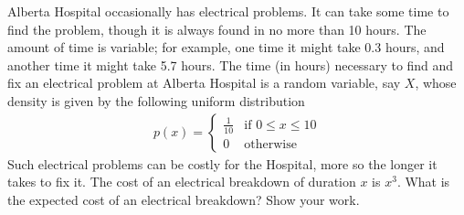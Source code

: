 Alberta Hospital occasionally has electrical problems. It can take some time to find the problem, though it is always found in no more than 10 hours. The amount of time is variable; for example, one time it might take 0.3 hours, and another time it might take 5.7 hours. The time (in hours) necessary to find and fix an electrical problem at Alberta Hospital is a random variable, say $X$, whose density is given by the following uniform distribution
%
\begin{align*}
p(x)=
\left\{
  \begin{array}{lr}
    \frac{1}{10} &  \text{if } 0 \le x \le 10\\
    0 &  \text{otherwise}
  \end{array}
\right.
\end{align*}
%
%
Such electrical problems can be costly for the Hospital, more so the longer it takes to fix it. The cost of an electrical breakdown of duration $x$ is $x^3$. 
What is the expected cost of an electrical breakdown? Show your work. 